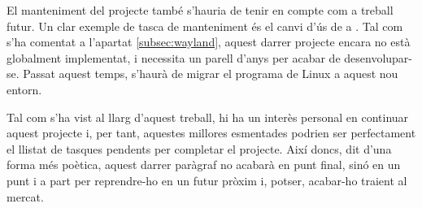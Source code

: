 El manteniment del projecte també s'hauria de tenir en compte com a treball
futur. Un clar exemple de tasca de manteniment és el canvi d'ús de 
a . Tal com s'ha comentat a l'apartat \ref{subsec:wayland},
aquest darrer projecte encara no està globalment implementat, i necessita un
parell d'anys per acabar de desenvolupar-se. Passat aquest temps, s'haurà
de migrar el programa de Linux a aquest nou entorn.

Tal com s'ha vist al llarg d'aquest treball, hi ha un interès personal en
continuar aquest projecte i, per tant, aquestes millores esmentades podrien ser
perfectament el llistat de tasques pendents per completar el projecte.
Així doncs, dit d'una forma més poètica, aquest darrer paràgraf no acabarà en
punt final, sinó en un punt i a part per reprendre-ho en un futur pròxim
i, potser, acabar-ho traient al mercat.
